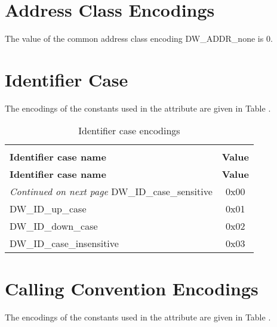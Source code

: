 \section{Address Class Encodings}
\label{datarep:addressclassencodings}

The value of the common address class encoding 
DW\-\_ADDR\-\_none is 0.


\section{Identifier Case}
\label{datarep:identifiercase}

The encodings of the constants used in the 
 attribute are given in 
Table .

\begin{centering}
\setlength{\extrarowheight}{0.1cm}
\begin{longtable}{l|c}
  \caption{Identifier case encodings} \label{tab:identifiercaseencodings}\\
  \hline \\ \bfseries Identifier case name&\bfseries Value \\ \hline
\endfirsthead
  \bfseries Identifier case name&\bfseries Value\\ \hline
\endhead
  \hline \emph{Continued on next page}
\endfoot
  \hline
\endlastfoot
DW\-\_ID\-\_case\-\_sensitive&0x00     \\
DW\-\_ID\-\_up\-\_case&0x01     \\
DW\-\_ID\-\_down\-\_case&0x02     \\
DW\-\_ID\-\_case\-\_insensitive&0x03     \\
\end{longtable}
\end{centering}

\section{Calling Convention Encodings}
\label{datarep:callingconventionencodings}
The encodings of the constants used in the 
 attribute are given in
Table .

